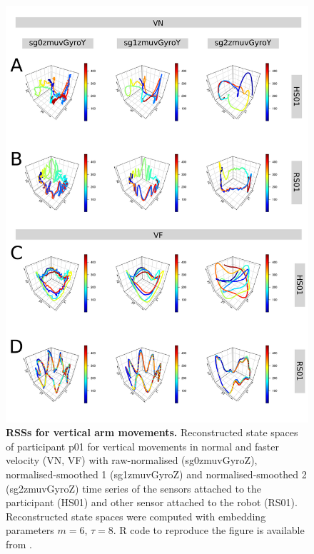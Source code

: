 \begin{figure}
\centering
\includegraphics[height=0.85\textheight]{rss_aV}
    \caption{
	{\bf RSSs for vertical arm movements.}
	Reconstructed state spaces %
	of participant p01 for vertical movements in normal and faster 
	velocity (VN, VF) with raw-normalised (sg0zmuvGyroZ), 
	normalised-smoothed 1 (sg1zmuvGyroZ) and 
	normalised-smoothed 2 (sg2zmuvGyroZ) time series of the 
	sensors attached to the participant (HS01) and other sensor 
	attached to the robot (RS01).	
	Reconstructed state spaces were computed with 
	embedding parameters $m=6$, $\tau=8$.
	R code to reproduce the figure is available from \cite{hwum2018}.
        }
    \label{fig:rss_aVw10}
\end{figure}


